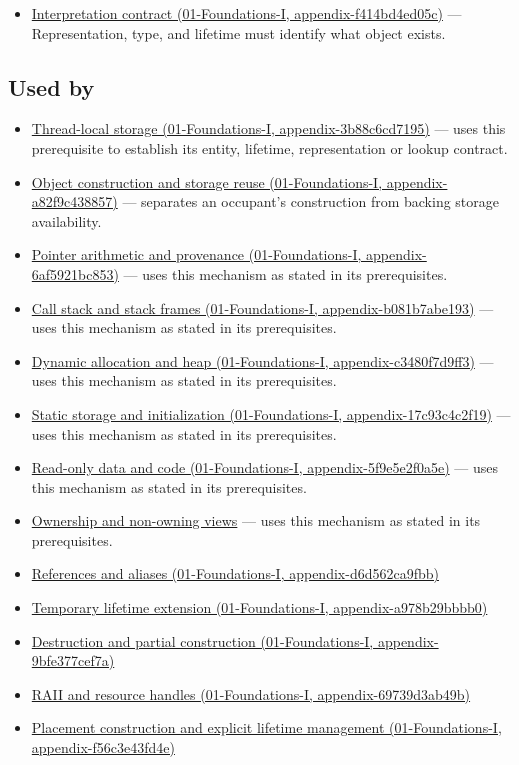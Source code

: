 \begin{itemize}
\tightlist
\item
  \href{}{Interpretation contract (01-Foundations-I, appendix-f414bd4ed05c)} --- Representation, type, and lifetime must identify what object exists.
\end{itemize}

\subsection{Used by}\label{used-by}

\begin{itemize}
\tightlist
\item
  \href{}{Thread-local storage (01-Foundations-I, appendix-3b88c6cd7195)} --- uses this prerequisite to establish its entity, lifetime, representation or lookup contract.
\item
  \href{}{Object construction and storage reuse (01-Foundations-I, appendix-a82f9c438857)} --- separates an occupant's construction from backing storage availability.
\item
  \href{}{Pointer arithmetic and provenance (01-Foundations-I, appendix-6af5921bc853)} --- uses this mechanism as stated in its prerequisites.
\item
  \href{}{Call stack and stack frames (01-Foundations-I, appendix-b081b7abe193)} --- uses this mechanism as stated in its prerequisites.
\item
  \href{}{Dynamic allocation and heap (01-Foundations-I, appendix-c3480f7d9ff3)} --- uses this mechanism as stated in its prerequisites.
\item
  \href{}{Static storage and initialization (01-Foundations-I, appendix-17c93c4c2f19)} --- uses this mechanism as stated in its prerequisites.
\item
  \href{}{Read-only data and code (01-Foundations-I, appendix-5f9e5e2f0a5e)} --- uses this mechanism as stated in its prerequisites.
\item
  \hyperref[appendix-d52e4486f527]{Ownership and non-owning views} --- uses this mechanism as stated in its prerequisites.
\item
  \href{}{References and aliases (01-Foundations-I, appendix-d6d562ca9fbb)}
\item
  \href{}{Temporary lifetime extension (01-Foundations-I, appendix-a978b29bbbb0)}
\item
  \href{}{Destruction and partial construction (01-Foundations-I, appendix-9bfe377cef7a)}
\item
  \href{}{RAII and resource handles (01-Foundations-I, appendix-69739d3ab49b)}
\item
  \href{}{Placement construction and explicit lifetime management (01-Foundations-I, appendix-f56c3e43fd4e)}
\end{itemize}

